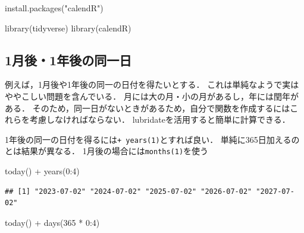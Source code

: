 \documentclass[
]{article}
\newenvironment{Shaded}{\begin{snugshade}}{\end{snugshade}}
\newcommand{\DecValTok}[1]{\textcolor[rgb]{0.00,0.00,0.81}{#1}}
\newcommand{\FunctionTok}[1]{\textcolor[rgb]{0.00,0.00,0.00}{#1}}
\newcommand{\NormalTok}[1]{#1}
\newcommand{\SpecialCharTok}[1]{\textcolor[rgb]{0.00,0.00,0.00}{#1}}
\newcommand{\StringTok}[1]{\textcolor[rgb]{0.31,0.60,0.02}{#1}}
\begin{document}
\begin{Shaded}
\begin{Highlighting}[]
\FunctionTok{install.packages}\NormalTok{(}\StringTok{"calendR"}\NormalTok{)}
\end{Highlighting}
\end{Shaded}

\begin{Shaded}
\begin{Highlighting}[]
\FunctionTok{library}\NormalTok{(tidyverse)}
\FunctionTok{library}\NormalTok{(calendR)}
\end{Highlighting}
\end{Shaded}

\hypertarget{ux6708ux5f8c1ux5e74ux5f8cux306eux540cux4e00ux65e5}{%
\subsection{1月後・1年後の同一日}\label{ux6708ux5f8c1ux5e74ux5f8cux306eux540cux4e00ux65e5}}

例えば，1月後や1年後の同一の日付を得たいとする．
これは単純なようで実はややこしい問題を含んでいる．
月には大の月・小の月があるし，年には閏年がある．
そのため，同一日がないときがあるため，自分で関数を作成するにはこれらを考慮しなければならない．
lubridateを活用すると簡単に計算できる．

1年後の同一の日付を得るには\texttt{+\ years(1)}とすれば良い．
単純に365日加えるのとは結果が異なる．
1月後の場合には\texttt{months(1)}を使う

\begin{Shaded}
\begin{Highlighting}[]
\FunctionTok{today}\NormalTok{() }\SpecialCharTok{+} \FunctionTok{years}\NormalTok{(}\DecValTok{0}\SpecialCharTok{:}\DecValTok{4}\NormalTok{)}
\end{Highlighting}
\end{Shaded}

\begin{verbatim}
## [1] "2023-07-02" "2024-07-02" "2025-07-02" "2026-07-02" "2027-07-02"
\end{verbatim}

\begin{Shaded}
\begin{Highlighting}[]
\FunctionTok{today}\NormalTok{() }\SpecialCharTok{+} \FunctionTok{days}\NormalTok{(}\DecValTok{365} \SpecialCharTok{*} \DecValTok{0}\SpecialCharTok{:}\DecValTok{4}\NormalTok{)}
\end{Highlighting}
\end{Shaded}
\end{document}
